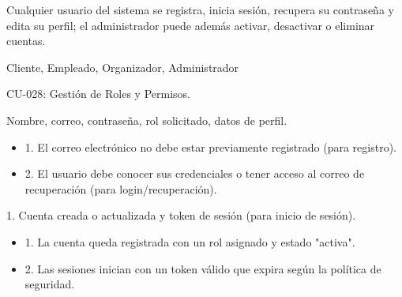 \begin{description}[leftmargin=!, labelwidth=3.4cm, style=nextline, topsep=3pt]
\item[Objetivo] Cualquier usuario del sistema se registra, inicia sesión, recupera su contraseña y edita su perfil; el administrador puede además activar, desactivar o eliminar cuentas.

\item[Actores] Cliente, Empleado, Organizador, Administrador

\item[CU relacionados] CU-028: Gestión de Roles y Permisos.

\item[Entradas] Nombre, correo, contraseña, rol solicitado, datos de perfil.

\item[Pre-condiciones] \hfill
\begin{itemize}[leftmargin=1.2em, topsep=1pt]
  \item 1. El correo electrónico no debe estar previamente registrado (para registro).
  \item 2. El usuario debe conocer sus credenciales o tener acceso al correo de recuperación (para login/recuperación).
\end{itemize}

\item[Salidas] 1. Cuenta creada o actualizada y token de sesión (para inicio de sesión).

\item[Post-condiciones] \hfill
\begin{itemize}[leftmargin=1.2em, topsep=1pt]
  \item 1. La cuenta queda registrada con un rol asignado y estado "activa".
  \item 2. Las sesiones inician con un token válido que expira según la política de seguridad.
\end{itemize}

\end{description}

